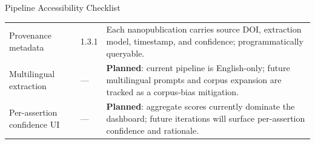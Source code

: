 \documentclass[
  ignorenonframetext,
]{beamer}
\begin{document}
\begin{frame}[allowframebreaks]{Pipeline Accessibility Checklist}
\begin{table}[H]
\begin{tabular}{p{4.5cm} p{1.7cm} p{8.0cm}}
Provenance metadata & 1.3.1 & Each nanopublication carries source DOI, extraction model, timestamp, and confidence; programmatically queryable. \\
Multilingual extraction & --- & \textbf{Planned}: current pipeline is English-only; future multilingual prompts and corpus expansion are tracked as a corpus-bias mitigation. \\
Per-assertion confidence UI & --- & \textbf{Planned}: aggregate scores currently dominate the dashboard; future iterations will surface per-assertion confidence and rationale. \\
\bottomrule
\end{tabular}
\end{table}

\FloatBarrier
\end{frame}
\end{document}
